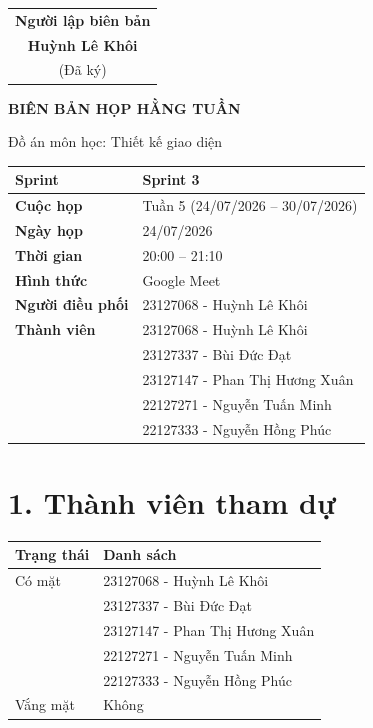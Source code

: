 \documentclass[11pt,a4paper]{article}
\begin{document}
\vspace{1.5cm}

\begin{flushright}
\begin{tabular}{c}
\textbf{Người lập biên bản}\\[2cm]
\textbf{Huỳnh Lê Khôi}\\
(Đã ký)
\end{tabular}
\end{flushright}

\newpage
\begin{center}
    {\Huge\bfseries BIÊN BẢN HỌP HẰNG TUẦN}

    \vspace{0.2cm}

    {\Large Đồ án môn học: Thiết kế giao diện}
\end{center}

\vspace{0.8cm}

\begin{tabularx}{\textwidth}{|>{\bfseries}p{4cm}|X|}
\hline
Sprint & Sprint 3 \\ \hline
Cuộc họp & Tuần 5 (24/07/2026 -- 30/07/2026) \\ \hline
Ngày họp & 24/07/2026 \\ \hline
Thời gian & 20:00 -- 21:10 \\ \hline
Hình thức & Google Meet \\ \hline
Người điều phối & 23127068 - Huỳnh Lê Khôi \\ \hline
Thành viên &
23127068 - Huỳnh Lê Khôi\\
&
23127337 - Bùi Đức Đạt\\
&
23127147 - Phan Thị Hương Xuân\\
&
22127271 - Nguyễn Tuấn Minh\\
&
22127333 - Nguyễn Hồng Phúc\\
\hline
\end{tabularx}

\vspace{0.8cm}


\section*{1. Thành viên tham dự}

\begin{tabularx}{\textwidth}{|p{4cm}|X|}
\hline
\rowcolor{gray!20}
\textbf{Trạng thái} & \textbf{Danh sách}\\
\hline
Có mặt &
23127068 - Huỳnh Lê Khôi\\
&
23127337 - Bùi Đức Đạt\\
&
23127147 - Phan Thị Hương Xuân\\
&
22127271 - Nguyễn Tuấn Minh\\
&
22127333 - Nguyễn Hồng Phúc\\
\hline
Vắng mặt & Không\\
\hline
\end{tabularx}
\end{document}
